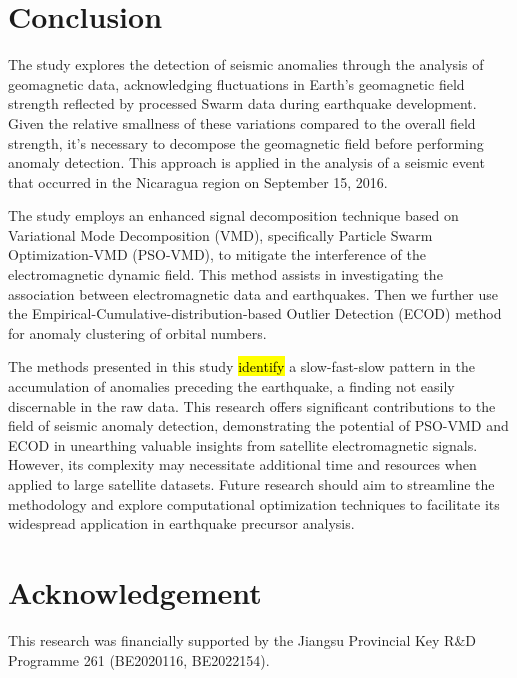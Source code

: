 \documentclass[3p,authoryear,preprint,12pt]{elsarticle}
\begin{document}
\section{Conclusion}

{The study explores the detection of seismic anomalies through the analysis of geomagnetic data, acknowledging fluctuations in Earth's geomagnetic field strength reflected by processed Swarm data during earthquake development.} Given the relative smallness of these variations compared to the overall field strength, it's necessary to decompose the geomagnetic field before performing anomaly detection. This approach is applied in the analysis of a seismic event that occurred in the Nicaragua region on September 15, 2016.

The study employs an enhanced signal decomposition technique based on Variational Mode Decomposition (VMD), specifically Particle Swarm Optimization-VMD (PSO-VMD), to mitigate the interference of the electromagnetic dynamic field. This method assists in investigating the association between electromagnetic data and earthquakes. Then we further use the Empirical-Cumulative-distribution-based Outlier Detection (ECOD) method for anomaly clustering of orbital numbers.

The methods presented in this study \hl{identify} a slow-fast-slow pattern in the accumulation of anomalies preceding the earthquake, a finding not easily discernable in the raw data. This research offers significant contributions to the field of seismic anomaly detection, demonstrating the potential of PSO-VMD and ECOD in unearthing valuable insights from satellite electromagnetic signals. {However, its complexity may necessitate additional time and resources when applied to large satellite datasets. Future research should aim to streamline the methodology and explore computational optimization techniques to facilitate its widespread application in earthquake precursor analysis.}
\section{Acknowledgement}
This research was financially supported by the Jiangsu Provincial Key R$\&$D Programme 261{ }(BE2020116, BE2022154).
    

%

\end{document}
